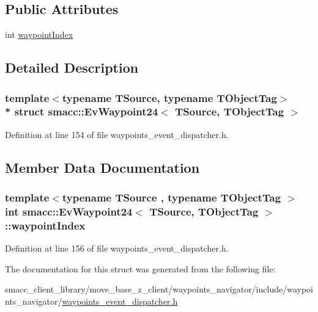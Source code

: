 \subsection*{Public Attributes}
\begin{DoxyCompactItemize}
\item 
int \hyperlink{structsmacc_1_1EvWaypoint24_a60de5264048432bf4842ab581aa36e0e}{waypoint\+Index}
\end{DoxyCompactItemize}


\subsection{Detailed Description}
\subsubsection*{template$<$typename T\+Source, typename T\+Object\+Tag$>$\\*
struct smacc\+::\+Ev\+Waypoint24$<$ T\+Source, T\+Object\+Tag $>$}



Definition at line 154 of file waypoints\+\_\+event\+\_\+dispatcher.\+h.



\subsection{Member Data Documentation}
\subsubsection[{\texorpdfstring{waypoint\+Index}{waypointIndex}}]{\setlength{\rightskip}{0pt plus 5cm}template$<$typename T\+Source , typename T\+Object\+Tag $>$ int {\bf smacc\+::\+Ev\+Waypoint24}$<$ T\+Source, T\+Object\+Tag $>$\+::waypoint\+Index}\hypertarget{structsmacc_1_1EvWaypoint24_a60de5264048432bf4842ab581aa36e0e}{}\label{structsmacc_1_1EvWaypoint24_a60de5264048432bf4842ab581aa36e0e}


Definition at line 156 of file waypoints\+\_\+event\+\_\+dispatcher.\+h.



The documentation for this struct was generated from the following file\+:\begin{DoxyCompactItemize}
\item 
smacc\+\_\+client\+\_\+library/move\+\_\+base\+\_\+z\+\_\+client/waypoints\+\_\+navigator/include/waypoints\+\_\+navigator/\hyperlink{waypoints__event__dispatcher_8h}{waypoints\+\_\+event\+\_\+dispatcher.\+h}\end{DoxyCompactItemize}
